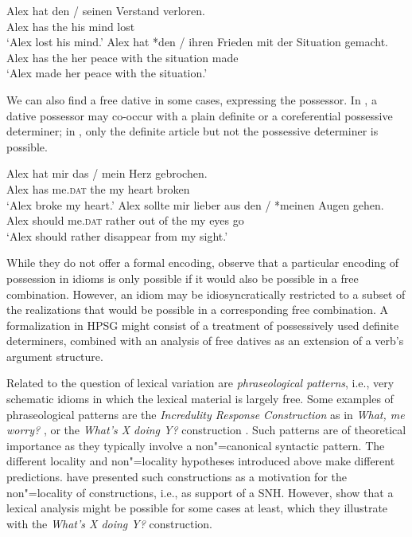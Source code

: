 \documentclass[output=paper
	        ,collection
	        ,collectionchapter
 	        ,biblatex
                ,babelshorthands
                ,newtxmath
                ,draftmode
                ,colorlinks, citecolor=brown
]{langscibook}
\begin{document}
\eal \label{ex-verstand-herz}
\ex 
\gll Alex hat den / seinen Verstand verloren.\\
Alex has the {} his mind lost\\
\glt `Alex lost his mind.'\label{ex-verstand}
\ex 
\gll Alex hat *den / ihren Frieden mit der Situation gemacht.\\
     Alex has the {} her peace with the situation made\\
\glt `Alex made her peace with the situation.'\label{ex-frieden}
\zl 


We can also find a free dative in some cases, expressing the possessor. 
In , a dative possessor may co-occur with a plain definite or a coreferential possessive determiner; in , only the definite article but not the possessive determiner is possible.  


\eal \label{ex-herz-augen}
\ex 
\gll Alex hat mir das / mein Herz gebrochen.\\
Alex has me.\textsc{dat} the {} my heart broken\\
\glt `Alex broke my heart.'\label{ex-herz}
\ex 
\gll Alex sollte mir lieber aus den / *meinen Augen gehen.\\
Alex should me.\textsc{dat} rather {out of} the {} my eyes go\\
\glt `Alex should rather disappear from my sight.'\label{ex-augen}
\zl 

While they do not offer a formal encoding, \citet{Markantonatou:Sailer:16} observe that a particular encoding of possession in idioms is only possible if it would also be possible in a free combination. However, an idiom may be idiosyncratically restricted to a subset of the realizations that would be possible in a corresponding free combination. A formalization in HPSG might consist of a treatment of possessively used definite determiners, combined with an analysis of free datives as an extension of a verb's argument structure.

 

Related to the question of lexical variation are \emph{phraseological patterns}, i.e., very schematic idioms 
in which the lexical material is largely free. Some examples 
of phraseological patterns are
  the \emph{Incredulity Response Construction} as in \emph{What, me worry?} \citep{Akmajian:84,Lambrecht:90}, 
or the \emph{What's X doing Y?} construction \citep{KF99a}.
Such patterns are of theoretical importance as they typically involve a non"=canonical syntactic pattern. 
The different locality and non"=locality hypotheses introduced above make different predictions. 
\citet{FKoC88a} have presented such constructions as a motivation for the non"=locality of constructions, i.e., as support of a SNH. However, \citet{KF99a} show that a lexical analysis might be possible for some cases at least, which they illustrate with the \emph{What's X doing Y?} construction. 
\end{document}

